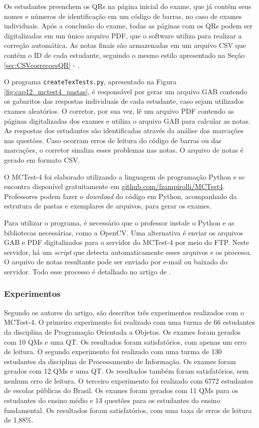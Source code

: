 Os estudantes preenchem os QRs na página inicial do exame, que já contém seus nomes e números de identificação em um código de barras, no caso de exames individuais. Após a conclusão do exame, todas as páginas com os QRs podem ser digitalizadas em um único arquivo PDF, que o software utiliza para realizar a correção automática. As notas finais são armazenadas em um arquivo CSV que contém o ID de cada estudante, seguindo o mesmo estilo apresentado na Seção \ref{sec:CSVcorrecoesQR} - .

O programa \verb|createTexTests.py|, apresentado na Figura \ref{fig:cap12_mctest4_pastas}, é responsável por gerar um arquivo GAB contendo os gabaritos das respostas individuais de cada estudante, caso sejam utilizados exames aleatórios. O corretor, por sua vez, lê um arquivo PDF contendo as páginas digitalizadas dos exames e utiliza o arquivo GAB para calcular as notas. As respostas dos estudantes são identificadas através da análise das marcações nas questões. Caso ocorram erros de leitura do código de barras ou das marcações, o corretor sinaliza esses problemas nas notas. O arquivo de notas é gerado em formato CSV.

O MCTest-4 foi elaborado utilizando a linguagem de programação Python e se encontra disponível gratuitamente em \href{https://github.com/fzampirolli/MCTest4}{github.com/fzampirolli/MCTest4}. Professores podem fazer o \textit{download} do código em Python, acompanhado da estrutura de pastas e exemplares de arquivos, para gerar os exames.

Para utilizar o programa, é necessário que o professor instale o Python e as bibliotecas necessárias, como a OpenCV. Uma alternativa é enviar os arquivos GAB e PDF digitalizados para o servidor do MCTest-4 por meio do FTP. Neste servidor, há um \textit{script} que detecta automaticamente esses arquivos e os processa. O arquivo de notas resultante pode ser enviado por e-mail ou baixado do servidor. Todo esse processo é detalhado no artigo de .

\subsubsection{Experimentos}

Segundo os autores do artigo, são descritos três experimentos realizados com o MCTest-4. O primeiro experimento foi realizado com uma turma de 66 estudantes da disciplina de Programação Orientada a Objetos. Os exames foram gerados com 10 QMs e uma QT. Os resultados foram satisfatórios, com apenas um erro de leitura. O segundo experimento foi realizado com uma turma de 130 estudantes da disciplina de Processamento de Informação. Os exames foram gerados com 12 QMs e uma QT. Os resultados também foram satisfatórios, sem nenhum erro de leitura. O terceiro experimento foi realizado com 6772 estudantes de escolas públicas do Brasil. Os exames foram gerados com 11 QMs para os estudantes do ensino médio e 13 questões para os estudantes do ensino fundamental. Os resultados foram satisfatórios, com uma taxa de erros de leitura de 1,88\%.

